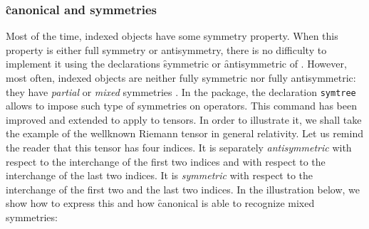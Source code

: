 \subsubsection{\f{canonical} and symmetries}

Most of the time, indexed objects have some symmetry property.
When this property is either full symmetry or antisymmetry, there
is no difficulty to implement it using the declarations
\f{symmetric} or
\f{antisymmetric}
of \REDUCE. However, most often, indexed objects are neither
fully symmetric nor fully antisymmetric: they have \emph{partial}
or \emph{mixed} symmetries%
%
.
In the  package, the declaration
\texttt{symtree} allows to impose such type of symmetries
on operators. This command has been improved and extended to
apply to tensors.
In order to illustrate it, we shall take the example of the
wellknown Riemann
tensor in general relativity.
 Let us remind the reader
that this tensor has four indices. It is separately \emph{antisymmetric} with
respect to the interchange of the first two indices and with respect to the
interchange of the last two indices. It is \emph{symmetric} with respect to
the interchange of the first two and the last two indices.
In the illustration below, we show how to express this and how
\f{canonical} is able to recognize mixed symmetries:
